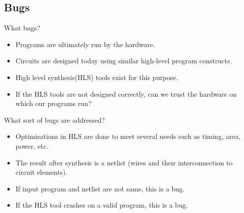 \documentclass[xcolor=dvipsnames]{beamer}
\begin{document}
    \subsection{Bugs}
    \begin{frame}{What bugs?}

        \begin{itemize}
            \item Programs are ultimately run by the hardware. 
            \item Circuits are designed today using similar high-level program constructs.
            \item High level synthesis(HLS) tools exist for this purpose. 
            \item If the HLS tools are not designed correctly, can we trust the hardware on which our programs run? 
        \end{itemize}
        
    \end{frame}


    \begin{frame}{What sort of bugs are addressed?}

        \begin{itemize}
            \item Optimizations in HLS are done to meet several needs such as timing, area, power, etc.
            \item The result after synthesis is a netlist (wires and their interconnection to circuit elements). 
            \item If input program and netlist are not same, this is a bug.
            \item If the HLS tool crashes on a valid program, this is a bug. 
        \end{itemize}
        
    \end{frame}
\end{document}
